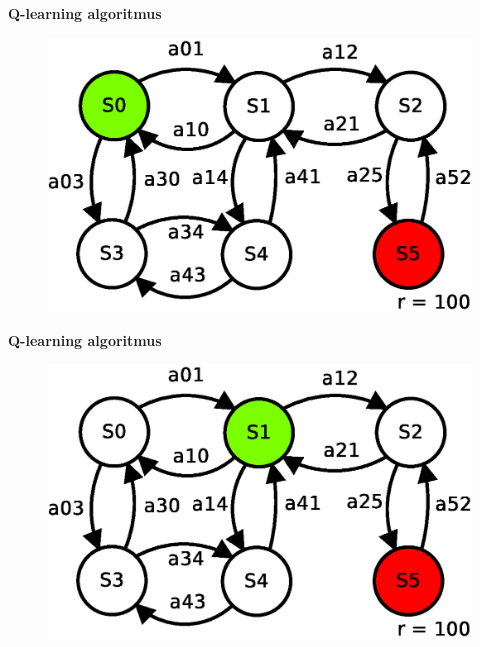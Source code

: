 \documentclass[xcolor=dvipsnames]{beamer}
\begin{document}
\begin{frame}{\bf Q-learning algoritmus}

\begin{figure}[!htb]
\includegraphics[scale=.5]{../diagrams/q_learning_table_01.eps}
\end{figure}

\end{frame}

\begin{frame}{\bf Q-learning algoritmus}

\begin{figure}[!htb]
\includegraphics[scale=.5]{../diagrams/q_learning_table_02.eps}
\end{figure}

\end{frame}
\end{document}

